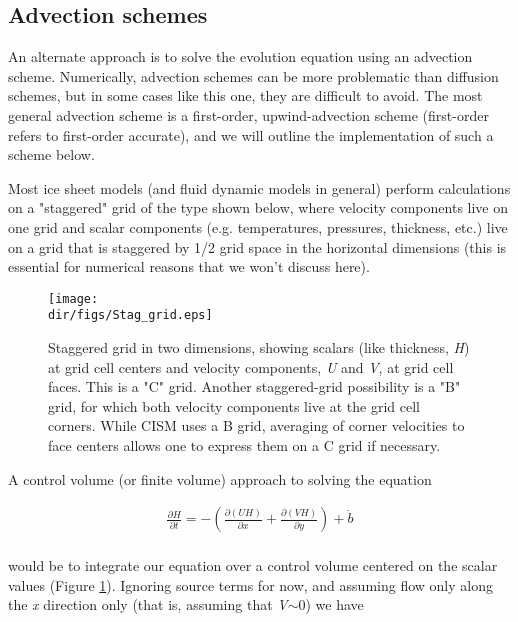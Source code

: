 \subsection{Advection schemes}
An alternate approach is to solve the evolution equation using an advection scheme. Numerically, advection schemes can be more problematic than diffusion schemes, but in some cases like this one, they are difficult to avoid. The most general advection scheme is a first-order, upwind-advection scheme (first-order refers to first-order accurate), and we will outline the implementation of such a scheme below.

Most ice sheet models (and fluid dynamic models in general) perform calculations on a "staggered" grid of the type shown below, where velocity components live on one grid and scalar components (e.g. temperatures, pressures, thickness, etc.) live on a grid that is staggered by 1/2 grid space in the horizontal dimensions (this is essential for numerical reasons that we won't discuss here).

\begin{figure}
  \begin{center}
    \texttt{[image: \\dir/figs/Stag\_grid.eps]}
  \end{center}
\caption{Staggered grid in two dimensions, showing scalars (like thickness, \textit{H}) at grid cell centers and velocity components, \textit{U} and \textit{V}, at grid cell faces. This is a "C" grid. Another staggered-grid possibility is a "B" grid, for which both velocity components live at the grid cell corners. While CISM uses a B grid, averaging of corner velocities to face centers allows one to express them on a C grid if necessary.}
  \label{fig:stag_c_grid}
\end{figure} 

A control volume (or finite volume) approach to solving the equation 

\begin{align*}
\frac{\partial H}{\partial t}=-\left( \frac{\partial \left( UH \right)}{\partial x}+\frac{\partial \left( VH \right)}{\partial y} \right)+\dot{b} \\ 
\end{align*}

would be to integrate our equation over a control volume centered on the scalar values (Figure \ref{fig:stag_c_grid}). Ignoring source terms for now, and assuming flow only along the \textit{x} direction only (that is, assuming that \textit{V}\(\sim\)0) we have

